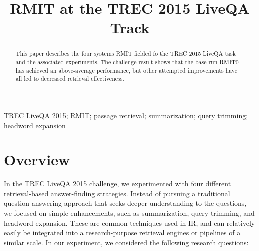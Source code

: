 \documentclass[a4paper,10pt,conference,compsocconf,final]{IEEEtran}
\newcommand{\opstyle}[1]{\mbox{\textsc{#1}}}
\begin{document}

\title{RMIT at the TREC 2015 LiveQA Track}
\author{
}

\maketitle

\begin{abstract} This paper describes the four systems RMIT fielded fo the
  \opstyle{TREC} 2015 LiveQA task and the associated experiments.  The
  challenge result shows that the base run RMIT0 has achieved an above-average
  performance, but other attempted improvements have all led to decreased
  retrieval effectiveness.
\end{abstract}

\begin{IEEEkeywords} 
  \opstyle{TREC} LiveQA 2015; RMIT; passage retrieval; summarization; query trimming; headword expansion
\end{IEEEkeywords}

\section{Overview}
\label{overview}
In the TREC LiveQA 2015 challenge, we experimented with four
different retrieval-based answer-finding strategies.
Instead of pursuing a traditional question-answering approach that
seeks deeper understanding to the questions, we focused on simple
enhancements, such as summarization, query trimming, and headword
expansion.
These are common techniques used in IR, and can relatively easily be
integrated into a research-purpose retrieval engines or pipelines of
a similar scale.
In our experiment, we considered the following research
questions:
\end{document}
